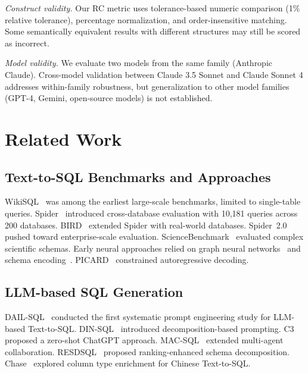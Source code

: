 \documentclass[sigconf, nonacm]{acmart}
\begin{document}
\emph{Construct validity.} Our RC metric uses tolerance-based numeric comparison (1\% relative tolerance), percentage normalization, and order-insensitive matching. Some semantically equivalent results with different structures may still be scored as incorrect.

\emph{Model validity.} We evaluate two models from the same family (Anthropic Claude). Cross-model validation between Claude 3.5 Sonnet and Claude Sonnet 4 addresses within-family robustness, but generalization to other model families (GPT-4, Gemini, open-source models) is not established.

\section{Related Work}
\label{sec:related}

\subsection{Text-to-SQL Benchmarks and Approaches}
WikiSQL~\cite{zhong2017seq2sql} was among the earliest large-scale benchmarks, limited to single-table queries. Spider~\cite{yu2018spider} introduced cross-database evaluation with 10,181 queries across 200 databases. BIRD~\cite{li2024bird} extended Spider with real-world databases. Spider~2.0~\cite{lei2024spider2} pushed toward enterprise-scale evaluation. ScienceBenchmark~\cite{bayer2024science} evaluated complex scientific schemas. Early neural approaches relied on graph neural networks~\cite{bogin2019gnn} and schema encoding~\cite{wang2020ratsql}. PICARD~\cite{scholak2021picard} constrained autoregressive decoding.

\subsection{LLM-based SQL Generation}
DAIL-SQL~\cite{gao2024dailsql} conducted the first systematic prompt engineering study for LLM-based Text-to-SQL. DIN-SQL~\cite{pourreza2024dinsql} introduced decomposition-based prompting. C3~\cite{dong2023c3} proposed a zero-shot ChatGPT approach. MAC-SQL~\cite{wang2024macsql} extended multi-agent collaboration. RESDSQL~\cite{li2023resdsql} proposed ranking-enhanced schema decomposition. Chase~\cite{guo2021chase} explored column type enrichment for Chinese Text-to-SQL.
\end{document}
